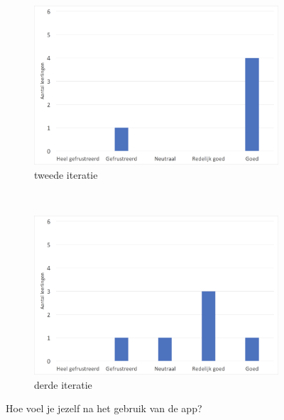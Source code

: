 \documentclass[11pt]{article}
\begin{document}
\begin{figure}
	\centering
    \begin{subfigure}[b]{0.48\textwidth}
        \includegraphics[width=\textwidth]{pictures/2_GebruikApp.png}
        \caption{tweede iteratie}
        \label{gebruik:app:twee}
    \end{subfigure}
    ~
    \begin{subfigure}[b]{0.48\textwidth}
        \includegraphics[width=\textwidth]{pictures/3_GebruikApp.png}
        \caption{derde iteratie}
        \label{gebruik:app:drie}
    \end{subfigure}
    \caption{Hoe voel je jezelf na het gebruik van de app?}\label{gebruik:app}
\end{figure}
\end{document}
